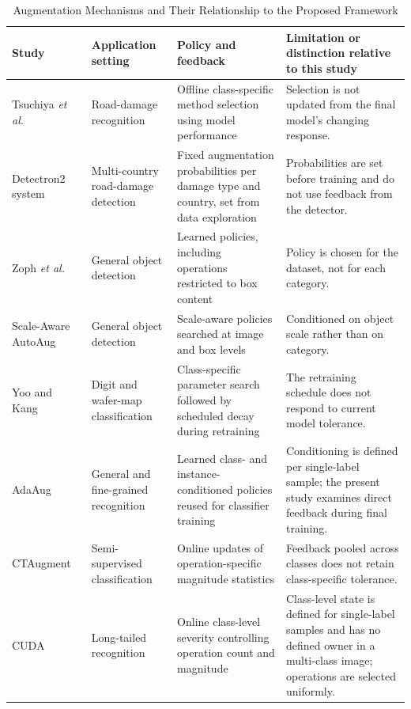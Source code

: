 \documentclass[conference]{IEEEtran}
\begin{document}
\begin{table}[t]
\caption{Augmentation Mechanisms and Their Relationship to the Proposed Framework}
\label{tab:policies}
\centering
\small
\setlength{\tabcolsep}{4pt}
\renewcommand{\arraystretch}{1.16}
\begin{tabularx}{\textwidth}{@{}p{}p{}p{}Y@{}}
\toprule
\textbf{Study} & \textbf{Application setting} & \textbf{Policy and feedback} & \textbf{Limitation or distinction relative to this study} \\
\midrule
Tsuchiya \emph{et al.}~\cite{tsuchiya2019} & Road-damage recognition & Offline class-specific method selection using model performance & Selection is not updated from the final model's changing response. \\
Detectron2 system~\cite{rdd_detectron2} & Multi-country road-damage detection & Fixed augmentation probabilities per damage type and country, set from data exploration & Probabilities are set before training and do not use feedback from the detector. \\
Zoph \emph{et al.}~\cite{zoph2020det} & General object detection & Learned policies, including operations restricted to box content & Policy is chosen for the dataset, not for each category. \\
Scale-Aware AutoAug~\cite{chen2021scale} & General object detection & Scale-aware policies searched at image and box levels & Conditioned on object scale rather than on category. \\
Yoo and Kang~\cite{yoo2023} & Digit and wafer-map classification & Class-specific parameter search followed by scheduled decay during retraining & The retraining schedule does not respond to current model tolerance. \\
AdaAug~\cite{cheung2022adaaug} & General and fine-grained recognition & Learned class- and instance-conditioned policies reused for classifier training & Conditioning is defined per single-label sample; the present study examines direct feedback during final training. \\
CTAugment~\cite{berthelot2020} & Semi-supervised classification & Online updates of operation-specific magnitude statistics & Feedback pooled across classes does not retain class-specific tolerance. \\
CUDA~\cite{ahn2023cuda} & Long-tailed recognition & Online class-level severity controlling operation count and magnitude & Class-level state is defined for single-label samples and has no defined owner in a multi-class image; operations are selected uniformly. \\

\end{tabularx}
\end{table}
\end{document}

